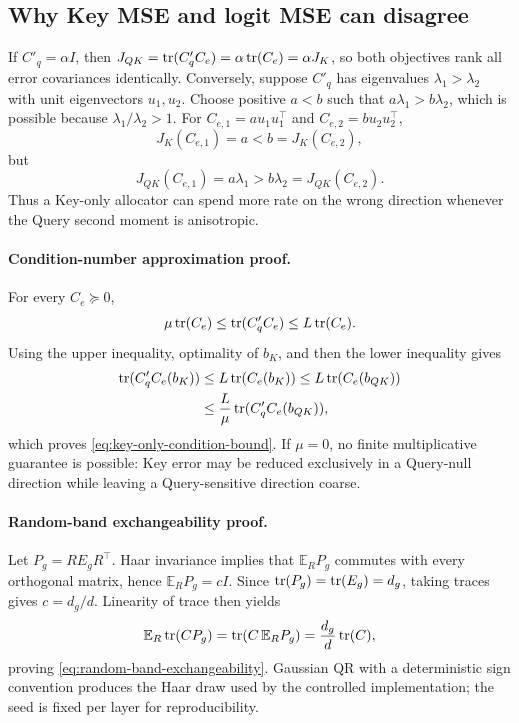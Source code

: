 \subsection{Why Key MSE and logit MSE can disagree}

If $C'_q=\alpha I$, then
$J_{QK}=\operatorname{tr}(C'_qC_e)=\alpha\operatorname{tr}(C_e)=\alpha J_K$, so both objectives rank all
error covariances identically.
Conversely, suppose $C'_q$ has eigenvalues
$\lambda_1>\lambda_2$ with unit eigenvectors $u_1,u_2$.
Choose positive $a<b$ such that
$a\lambda_1>b\lambda_2$, which is possible because
$\lambda_1/\lambda_2>1$.
For
$C_{e,1}=a u_1u_1^\top$ and
$C_{e,2}=b u_2u_2^\top$,
\begin{equation}
 J_K(C_{e,1})=a<b=J_K(C_{e,2}),
\end{equation}
but
\begin{equation}
 J_{QK}(C_{e,1})=a\lambda_1>
 b\lambda_2=J_{QK}(C_{e,2}).
\end{equation}
Thus a Key-only allocator can spend more rate on the wrong direction whenever
the Query second moment is anisotropic.

\paragraph{Condition-number approximation proof.}
For every $C_e\succeq0$,
\begin{equation}
 \mu\operatorname{tr}(C_e)\le\operatorname{tr}(C'_qC_e)\le L\operatorname{tr}(C_e).
\end{equation}
Using the upper inequality, optimality of $b_K$, and then the lower
inequality gives
\begin{align}
 \operatorname{tr}(C'_qC_e(b_K))
 &\le L\operatorname{tr}(C_e(b_K))
 \le L\operatorname{tr}(C_e(b_{QK}))\\
 &\le \frac{L}{\mu}\operatorname{tr}(C'_qC_e(b_{QK})),
\end{align}
which proves \cref{eq:key-only-condition-bound}.  If $\mu=0$, no finite
multiplicative guarantee is possible: Key error may be reduced exclusively
in a Query-null direction while leaving a Query-sensitive direction coarse.

\paragraph{Random-band exchangeability proof.}
Let $P_g=RE_gR^\top$.  Haar invariance implies that
$\mathbb E_RP_g$ commutes with every orthogonal matrix, hence
$\mathbb E_RP_g=cI$.  Since
$\operatorname{tr}(P_g)=\operatorname{tr}(E_g)=d_g$, taking traces gives $c=d_g/d$.
Linearity of trace then yields
\begin{equation}
 \mathbb E_R\operatorname{tr}(CP_g)
 =\operatorname{tr}(C\,\mathbb E_RP_g)
 =\frac{d_g}{d}\operatorname{tr}(C),
\end{equation}
proving \cref{eq:random-band-exchangeability}.  Gaussian QR with a
deterministic sign convention produces the Haar draw used by the controlled
implementation; the seed is fixed per layer for reproducibility.

